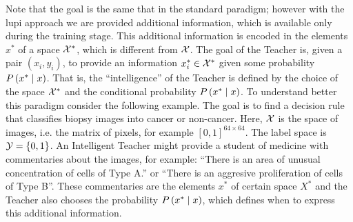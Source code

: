 Note that the goal is the same that in the standard paradigm; however with the \acrshort{lupi} approach we are provided additional information, which is available only during the training stage. This additional information is encoded in the elements $x^*$ of a space $\mathcal{X}^*$, which is different from $\mathcal{X}$. The goal of the Teacher is, given a pair $(x_i, y_i)$, to provide an information $x_i^* \in \mathcal{X}^*$ given some probability $P\left( x^* \;\middle\vert\; x \right)$. That is, the ``intelligence'' of the Teacher is defined by the choice of the space $\mathcal{X}^*$ and the conditional probability $P\left( x^* \;\middle\vert\; x \right)$. 
To understand better this paradigm consider the following example.
 The goal is to find a decision rule that classifies biopsy images into cancer or non-cancer. Here, $\mathcal{X}$ is the space of images, i.e. the matrix of pixels, for example $[0, 1]^{64 \times 64}$. The label space is $\mathcal{Y} = \left\{0, 1\right\}$. An Intelligent Teacher might provide a student of medicine with commentaries about the images, for example: ``There is an area of unusual concentration of cells of Type A.'' or ``There is an aggresive proliferation of cells of Type B''. These commentaries are the elements $x^*$ of certain space $X^*$ and the Teacher also chooses the probability $P\left( x^* \;\middle\vert\; x \right)$, which defines when to express this additional information.

